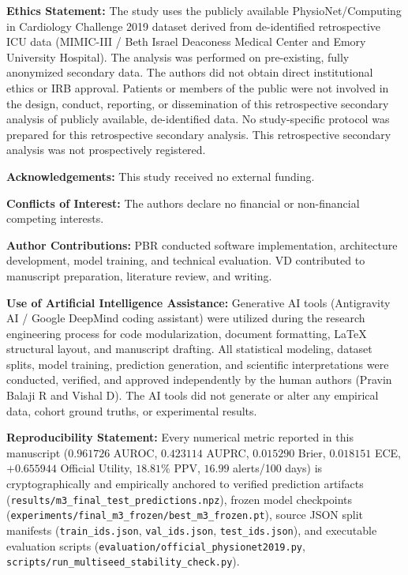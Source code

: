 \documentclass[11pt,a4paper]{article}
\begin{document}
\textbf{Ethics Statement:} The study uses the publicly available PhysioNet/Computing in Cardiology Challenge 2019 dataset derived from de-identified retrospective ICU data (MIMIC-III / Beth Israel Deaconess Medical Center and Emory University Hospital). The analysis was performed on pre-existing, fully anonymized secondary data. The authors did not obtain direct institutional ethics or IRB approval. Patients or members of the public were not involved in the design, conduct, reporting, or dissemination of this retrospective secondary analysis of publicly available, de-identified data. No study-specific protocol was prepared for this retrospective secondary analysis. This retrospective secondary analysis was not prospectively registered.

\textbf{Acknowledgements:} This study received no external funding.

\textbf{Conflicts of Interest:} The authors declare no financial or non-financial competing interests.

\textbf{Author Contributions:} PBR conducted software implementation, architecture development, model training, and technical evaluation. VD contributed to manuscript preparation, literature review, and writing.

\textbf{Use of Artificial Intelligence Assistance:} Generative AI tools (Antigravity AI / Google DeepMind coding assistant) were utilized during the research engineering process for code modularization, document formatting, LaTeX structural layout, and manuscript drafting. All statistical modeling, dataset splits, model training, prediction generation, and scientific interpretations were conducted, verified, and approved independently by the human authors (Pravin Balaji R and Vishal D). The AI tools did not generate or alter any empirical data, cohort ground truths, or experimental results.

\textbf{Reproducibility Statement:} Every numerical metric reported in this manuscript ($0.961726$ AUROC, $0.423114$ AUPRC, $0.015290$ Brier, $0.018151$ ECE, $+0.655944$ Official Utility, $18.81\%$ PPV, $16.99$ alerts/100 days) is cryptographically and empirically anchored to verified prediction artifacts (\texttt{results/m3\_final\_test\_predictions.npz}), frozen model checkpoints (\texttt{experiments/final\_m3\_frozen/best\_m3\_frozen.pt}), source JSON split manifests (\texttt{train\_ids.json}, \texttt{val\_ids.json}, \texttt{test\_ids.json}), and executable evaluation scripts (\texttt{evaluation/official\_physionet2019.py}, \texttt{scripts/run\_multiseed\_stability\_check.py}).
\end{document}
